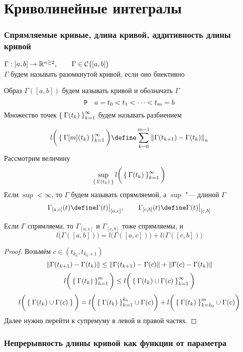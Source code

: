 \part{Криволинейные интегралы}

\section{Спрямляемые кривые, длина кривой, аддитивность длины кривой}

\begin{definition}
	$ \Gamma : [a, b] \to \R^{n \ge 2}, \qquad \Gamma \in \Cont{[a, b]} $ \\
	$ \Gamma $ будем называть разомкнутой кривой, если оно биективно
\end{definition}

Образ $ \Gamma([a, b]) $ будем называть кривой и обозначать $ \Gamma $
$$ \Par \quad a = t_0 < t_1 < \dots < t_m = b $$
Множество точек $ \seq{\Gamma(t_k)}k $ будем называть разбиением

$$ l \bigg( \seq{\Gamma[m](t_k)}k \bigg) \define \sum_{k = 0}^{m - 1} \norm{\Gamma(t_{k + 1}) - \Gamma(t_k)}_n $$
Рассмотрим величину
$$ \sup\limits_{\set{\Gamma(t_k)}} l \bigg( \seq{\Gamma(t_k)}k \bigg) $$
Если $ \sup < \infty $, то $ \Gamma $ будем называть спрямляемой, а $ \sup $ "--- длиной $ \Gamma $
$$ \Gamma_{[a, c]}(t) \define \Gamma(t)\clamp{[a, c]}, \qquad \Gamma_{[c, b]} (t) \define \Gamma(t)\clamp{[c, b]} $$

\begin{statement}
	Если $ \Gamma $ спрямляема, то $ \Gamma_{[a, c]} $ и $ \Gamma_{[c, b]} $ тоже спрямляемы, и
	$$ l \bigg( \Gamma([a, b]) \bigg) = l \bigg( \Gamma([a, c]) \bigg) + l \bigg( \Gamma([c, b]) \bigg) $$
\end{statement}

\begin{proof}
	Возьмём $ c \in (t_{k_0}, t_{k_0 + 1}) $
	$$ \norm{\Gamma(t_{k + 1}) - \Gamma(t_k)} \le \norm{\Gamma(t_{k + 1}) - \Gamma(c)} + \norm{\Gamma(c) - \Gamma(t_k)} $$
	$$ l \bigg( \seq[m]{\Gamma(t_k)}k \bigg) \le l \bigg( \seq{\Gamma(t_k) \cup \Gamma(c)}k \bigg) $$
	$$ l \bigg( \set{\Gamma(t_k) \cup \Gamma(c)} \bigg) = l \bigg( \seq[k_0]{\Gamma(t_k)}k \cup \Gamma(c) \bigg) + l \bigg( \seqv[m]{\Gamma(t_k)}k{k_0} \cup \Gamma(c) \bigg) $$
	Далее нужно перейти к супремуму в левой и правой частях.
\end{proof}

\section{Непрерывность длины кривой как функции от параметра}

